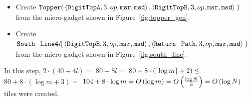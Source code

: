 \begin{itemize}
\begin{itemize}
            \item Create
            $\begin{aligned}[t]
                {\tt Topper}(& \left\langle {\tt DigitTopA}, 3, \inc, {\tt msr}, {\tt msd}\right\rangle,
                               \left\langle {\tt DigitTopB}, 3, \inc, {\tt msr}, {\tt msd}\right\rangle \;)
            \end{aligned}$\\ from the micro-gadget shown in Figure~\ref{fig:topper_gen}.


            \item Create
            $\begin{aligned}[t]
                {\tt South\_Line4\textit{l}}(& \left\langle {\tt DigitTopB}, 3, \inc, {\tt msr}, {\tt msd}\right\rangle,
                                               \left\langle \returnpath,     3, \inc, {\tt msr}, {\tt msd}\right\rangle \;)
            \end{aligned}$\\ from the micro-gadget shown in Figure~\ref{fig:south_line}.
        \end{itemize}
        In this step, $2 \cdot \left( 40 + 4l \right) =$
        $80 + 8l =$
        $80 + 8 \cdot \left( \ceil*{\log m} + 2 \right) \leq$
        $80 + 8 \cdot \left( {\log m} + 3 \right) =$
        $104 + 8 \cdot {\log m} = \bigologm$ tiles were created.
\end{itemize}

